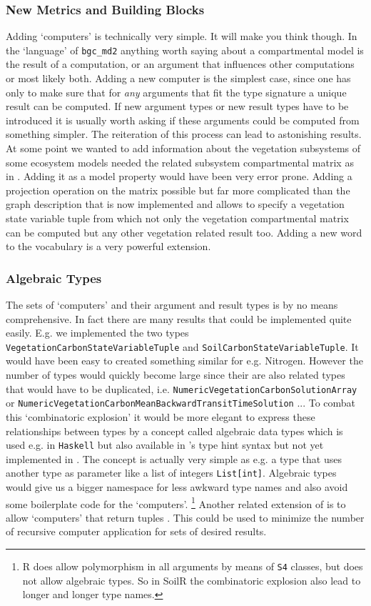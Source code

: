 \subsubsection{New Metrics and Building Blocks}
Adding `computers' is technically very simple. It will make you think though.
In the `language' of \texttt{bgc\_md2} anything worth saying about a compartmental model is the result of a computation, or an argument that influences other computations or most likely both.
Adding a new computer is the simplest case, since one has only to make sure that for \emph{any} arguments that fit the type signature a unique result can be computed. If new argument types or new result types have to be introduced it is usually worth asking if these arguments could be computed from something simpler. The reiteration of this process can lead to astonishing results.
At some point we wanted to add information about the vegetation subsystems of some ecosystem models needed the related subsystem compartmental matrix as in \citep{Ceballos2018Biogeosciences}. Adding it as a model property would have been very error prone.
Adding a projection operation on the matrix possible but far more complicated
than the graph description that is now implemented and allows to specify a
vegetation state variable tuple from which not only the vegetation
compartmental matrix can be computed but any other vegetation related result too. 
Adding a new word to the vocabulary is a very powerful extension.

\subsubsection{Algebraic Types}
The sets of `computers' and their argument and result types is by no means comprehensive.
In fact there are many results that could be implemented quite easily. 
E.g. we implemented the two types \texttt{VegetationCarbonStateVariableTuple} and 
\texttt{SoilCarbonStateVariableTuple}. It would have been easy to created something similar for e.g. Nitrogen. However the number of types would quickly become large since their
are also related types that would have to be duplicated, i.e. \texttt{NumericVegetationCarbonSolutionArray} or \texttt{NumericVegetationCarbonMeanBackwardTransitTimeSolution} ...
To combat this `combinatoric explosion' it would be more elegant to express these relationships between types by a concept called
algebraic data types which is used e.g. in  \texttt{Haskell} but also available in \python{} 's type hint syntax but not yet implemented in \ComputabilityGraphs{}.
The concept is actually very simple as e.g. a type that uses another type as parameter like a list of integers \texttt{List[int]}. Algebraic types would give us a bigger namespace 
for less awkward type names and also avoid some boilerplate code for the `computers'.
\footnote{R does allow polymorphism in all arguments by means of \texttt{S4} classes, but does not allow algebraic types. So in SoilR the combinatoric explosion also lead to longer and longer type names.
}
Another related extension of \ComputabilityGraphs{} is to allow `computers' that return tuples . 
This could be used to minimize the number of recursive computer application for sets of desired results.   

